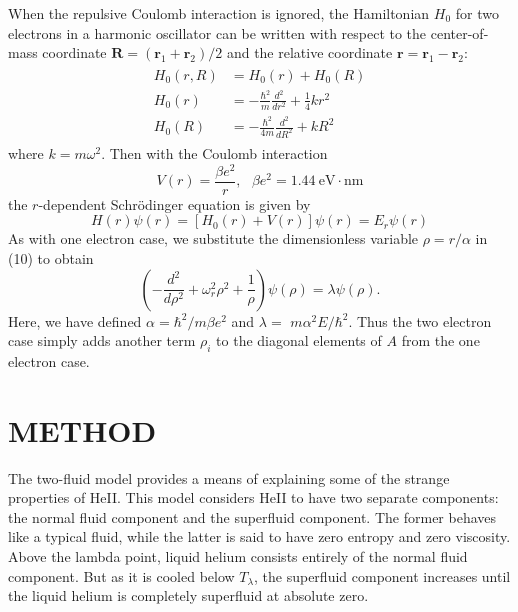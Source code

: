 \documentclass[prb,aps,twocolumn,showpacs,10pt]{revtex4-1}
\begin{document}
When the repulsive Coulomb interaction is ignored, the Hamiltonian $H_0$ for two electrons in a harmonic oscillator can be written with respect to the center-of-mass coordinate $\mathbf{R}=(\mathbf{r}_1+\mathbf{r}_2)/2$ and the relative coordinate $\mathbf{r}=\mathbf{r}_1-\mathbf{r}_2$:
\begin{align}
\label{eqn:eqlabel}
\begin{split}
H_0(r,R) &= H_0(r) + H_0(R)\\
H_0(r) &=-\frac{\hbar^2}{m} \frac{d^2}{dr^2} + \frac{1}{4} k r^2\\
H_0(R) &= -\frac{\hbar^2}{4m} \frac{d^2}{dR^2} + kR^2
\end{split}
\end{align}
where $k=m\omega^2$. Then with the Coulomb interaction
\begin{equation}
V(r) = \frac{\beta e^2}{r}, \ \ \ \beta e^2 = 1.44 \ \text{eV} \cdot \text{nm}
\end{equation}
the $r$-dependent Schr{\"o}dinger equation is given by
\begin{equation}
H(r)\psi(r)=[H_0(r)+V(r)]\psi(r)=E_r \psi(r)
\end{equation}
As with one electron case, we substitute the dimensionless variable $\rho=r/\alpha$ in (10) to obtain
\begin{equation}
\left( -\frac{d^2}{d\rho^2} + \omega_r^2\rho^2 + \frac{1}{\rho}\right) \psi(\rho) = \lambda\psi(\rho).
\end{equation}
Here, we have defined $\alpha=\hbar^2/m\beta e^2$ and $\lambda = $ 
$m\alpha^2E/\hbar^2$. Thus the two electron case simply adds another term $\rho_i$ to the diagonal elements of $A$ from the one electron case. 

\section{METHOD}


The two-fluid model provides a means of explaining some of the strange properties of HeII. This model considers HeII to have two separate components: the normal fluid component and the superfluid component. The former behaves like a typical fluid, while the latter is said to have zero entropy and zero viscosity. Above the lambda point, liquid helium consists entirely of the normal fluid component. But as it is cooled below $T_\lambda$, the superfluid component increases until the liquid helium is completely superfluid at absolute zero.  
\end{document}
